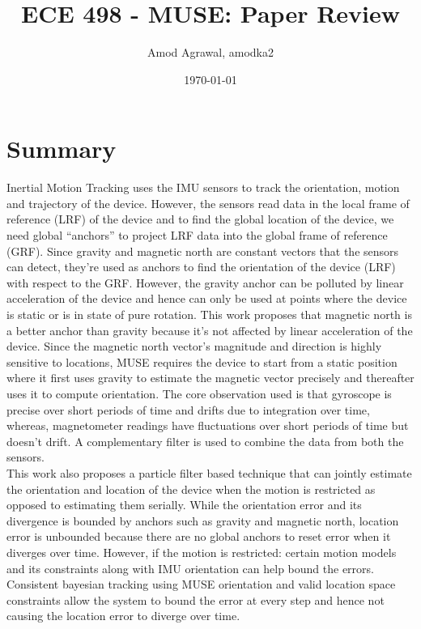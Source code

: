 \documentclass[a4paper]{article}
\title{ECE 498 - MUSE: Paper Review}
\author{Amod Agrawal, amodka2}
\date{\today}
\begin{document}
\maketitle
\section{Summary}
Inertial Motion Tracking uses the IMU sensors to track the orientation, motion and trajectory of the device. However, the sensors read data in the local frame of reference (LRF) of the device and to find the global location of the device, we need global ``anchors'' to project LRF data into the global frame of reference (GRF). Since gravity and magnetic north are constant vectors that the sensors can detect, they're used as anchors to find the orientation of the device (LRF) with respect to the GRF. However, the gravity anchor can be polluted by linear acceleration of the device and hence can only be used at points where the device is static or is in state of pure rotation. This work proposes that magnetic north is a better anchor than gravity because it's not affected by linear acceleration of the device. Since the magnetic north vector's magnitude and direction is highly sensitive to locations, MUSE requires the device to start from a static position where it first uses gravity to estimate the magnetic vector precisely and thereafter uses it to compute orientation. The core observation used is that gyroscope is precise over short periods of time and drifts due to integration over time, whereas, magnetometer readings have fluctuations over short periods of time but doesn't drift. A complementary filter is used to combine the data from both the sensors. \\

This work also proposes a particle filter based technique that can jointly estimate the orientation and location of the device when the motion is restricted as opposed to estimating them serially. While the orientation error and its divergence is bounded by anchors such as gravity and magnetic north, location error is unbounded because there are no global anchors to reset error when it diverges over time. However, if the motion is restricted: certain motion models and its constraints along with IMU orientation can help bound the errors. Consistent bayesian tracking using MUSE orientation and valid location space constraints allow the system to bound the error at every step and hence not causing the location error to diverge over time. 
\end{document}
